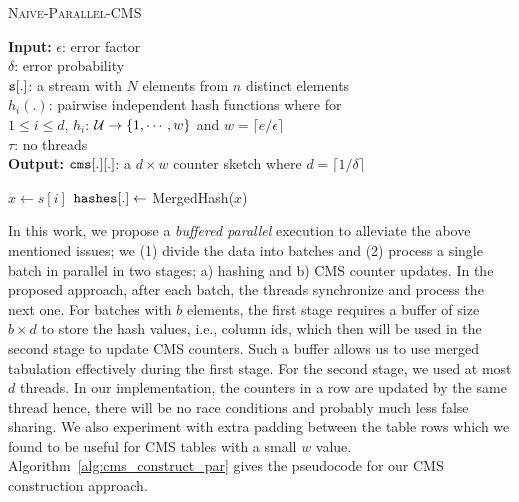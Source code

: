 \documentclass[10pt, conference, compsocconf]{IEEEtran}
\renewcommand{\algorithmicrequire}{\textbf{Input:}}
\renewcommand{\algorithmicensure}{\textbf{Output:}}
\begin{document}
 \begin{algorithm}[htbp]
  	\small
  	\caption{\textsc{Naive-Parallel-CMS}} 
  	\algorithmicrequire{  $\epsilon$: error factor\\
	 		\hspace*{6ex} $\delta$: error probability \\
	 	  \hspace*{7ex}${\tt s}[.]$: a stream with $N$ elements from $n$ distinct elements \\ 
		  \hspace*{7ex}$h_i(.)$: pairwise independent hash functions where for \\ 
		  \hspace*{13ex}$1\leq i \leq d$,  $h_i$: ${\cal U} \rightarrow \{1,\cdots,w\}$ and $w = \lceil e/\epsilon \rceil$\\
		  \hspace*{7ex}$\tau$: no threads\\ }
	 \algorithmicensure{ ${\tt cms}[.][.]$: a $d \times w$ counter sketch where $d = \lceil 1/\delta \rceil$ \\
	 }
  	\begin{algorithmic}[1]
		\State{}
		
			\State $x  \leftarrow s[i]$
			\State ${\tt hashes}[.] \leftarrow$ {\sc MergedHash}($x$)

			\EndFor
		\EndFor
	\end{algorithmic}
	\label{alg:cms_construct_par_nobuf}
\end{algorithm} 	

In this work, we propose a {\em buffered parallel} execution to alleviate the above mentioned issues; we (1) divide the data into batches and (2) process a single batch in parallel in two stages; a) hashing and b) CMS counter updates. In the proposed approach, after each batch, the threads synchronize and process the next one. For batches with $b$ elements, the first stage requires a buffer of size $b \times d$ to store the hash values, i.e., column ids, which then will be used in the second stage to update CMS counters. Such a buffer allows us to use merged tabulation effectively during the first stage. For the second stage, we used at most $d$ threads. In our implementation, the counters in a row are updated by the same thread hence, there will be no race conditions and probably much less false sharing. We also experiment with extra padding between the table rows which we found to be useful for CMS tables with a small $w$ value. Algorithm~\ref{alg:cms_construct_par} gives the pseudocode for our CMS construction approach.
\end{document}
